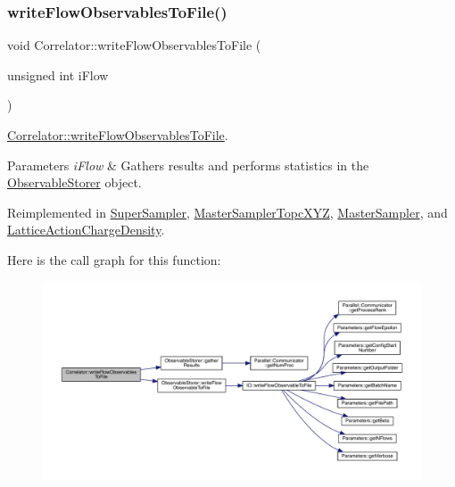 \subsubsection{\texorpdfstring{writeFlowObservablesToFile()}{writeFlowObservablesToFile()}}
{\footnotesize\ttfamily void Correlator\+::write\+Flow\+Observables\+To\+File (\begin{DoxyParamCaption}\item[{unsigned int}]{i\+Flow }\end{DoxyParamCaption})\hspace{0.3cm}{\ttfamily [virtual]}}



\mbox{\hyperlink{class_correlator_a168512b2ce182d9478db47f100125fa6}{Correlator\+::write\+Flow\+Observables\+To\+File}}. 


\begin{DoxyParams}{Parameters}
{\em i\+Flow} & Gathers results and performs statistics in the \mbox{\hyperlink{class_observable_storer}{Observable\+Storer}} object. \\
\hline
\end{DoxyParams}


Reimplemented in \mbox{\hyperlink{class_super_sampler_a410b650ebccdb03519c88908a3a8013e}{Super\+Sampler}}, \mbox{\hyperlink{class_master_sampler_topc_x_y_z_a4fba4290e4406e18ef3f2904c6ae364f}{Master\+Sampler\+Topc\+X\+YZ}}, \mbox{\hyperlink{class_master_sampler_ad475928217ac61fae134128904aaa9f8}{Master\+Sampler}}, and \mbox{\hyperlink{class_lattice_action_charge_density_a54226556dc1497c311e4a4d50bf44c26}{Lattice\+Action\+Charge\+Density}}.

Here is the call graph for this function\+:\nopagebreak
\begin{figure}[H]
\begin{center}
\leavevmode
\includegraphics[width=350pt]{class_correlator_a168512b2ce182d9478db47f100125fa6_cgraph}
\end{center}
\end{figure}
\mbox{\label{class_correlator_a9e8d80e30e4fbe3b7fe57521538cb5ff}} 
